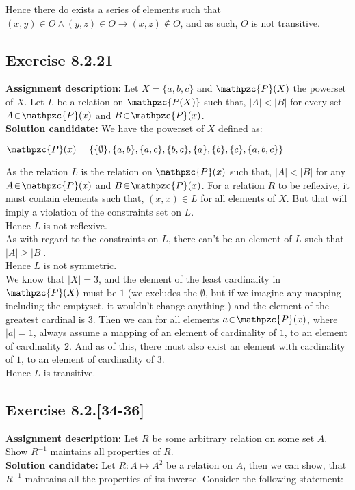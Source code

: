 \documentclass{report}
\newcommand{\cent}[1]{\begin{center}#1\end{center}}
\newcommand{\In}{\! \in \!}
\newcommand{\script}[1]{\mathpzc{#1}}
\newcommand{\AssignmentDescription}{\textbf{Assignment description: }}
\newcommand{\Solution}{\textbf{Solution candidate: }}
\newcommand{\Exercise}[1]{\subsection{Exercise #1}}
\begin{document}
	 Hence there do exists a series of elements such that $(x,y) \In O \wedge (y,z) \In O \to (x,z) \notin O$, and as such, $O$ is not transitive.
	 
	 \Exercise{8.2.21}
	 
 	\AssignmentDescription
 	Let $X=\{a,b,c\}$ and $\script{P}(X)$ the powerset of $X$. Let $L$ be a relation on $\script{P(X)}$ such that, $|A| < |B|$ for every set $A \In \script{P}(x)$ and $B \In \script{P}(x) $.\\

	\Solution
	We have the powerset of $X$ defined as:
	
	\cent{$\script{P}(x) = \{\{\emptyset\},\{a,b\},\{a,c\},\{b,c\},\{a\},\{b\},\{c\},\{a,b,c\}\}$}
	
	As the relation $L$ is the relation on $\script{P}(x)$ such that, $|A| < |B|$ for any $A \In \script{P}(x)$ and $B \In \script{P}(x)$. For a relation $R$ to be reflexive, it must contain elements such that, $(x,x) \In L$ for all elements of $X$. But that will imply a violation of the constraints set on $L$.\\
	
	Hence $L$ is not reflexive.\\
	
	As with regard to the constraints on $L$, there can't be an element of $L$ such that $|A| \geq |B| $.\\
	
	Hence $L$ is not symmetric.\\
	
	
	We know that $|X|=3$, and the element of the least cardinality in $\script{P}(X)$ must be $ 1 $ (we excludes the $\emptyset$, but if we imagine any mapping including the emptyset, it wouldn't change anything.) and the element of the greatest cardinal is $3$. Then we can for all elements $a  \In \script{P}(x)$, where $|a| = 1$, always assume a mapping of an element of cardinality of $1$, to an element of cardinality $ 2 $. And as of this, there must also exist an element with cardinality of $1$, to an element of cardinality of $3$.\\
	
	Hence $L$ is transitive.
	
	\Exercise{8.2.[34-36]}
	
	\AssignmentDescription
	Let $R$ be some arbitrary relation on some set $A$. Show $R^{-1}$ maintains all properties of $R$.\\
	
	\Solution
	Let $R : A \mapsto A^2$ be a relation on $A$, then we can show, that $R^{-1}$ maintains all the properties of its inverse. Consider the following statement:
	
\end{document}
